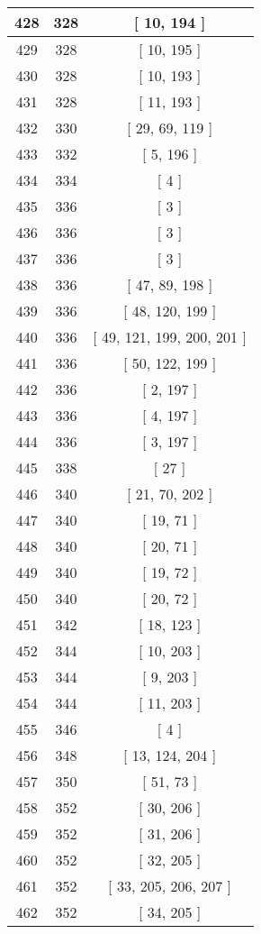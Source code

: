\begin{center}
\begin{longtable}[H]{|| c c c ||}
\hline
428 & 328 & [ 10, 194 ] \\ 
\hline
429 & 328 & [ 10, 195 ] \\ 
\hline
430 & 328 & [ 10, 193 ] \\ 
\hline
431 & 328 & [ 11, 193 ] \\ 
\hline
432 & 330 & [ 29, 69, 119 ] \\ 
\hline
433 & 332 & [ 5, 196 ] \\ 
\hline
434 & 334 & [ 4 ] \\ 
\hline
435 & 336 & [ 3 ] \\ 
\hline
436 & 336 & [ 3 ] \\ 
\hline
437 & 336 & [ 3 ] \\ 
\hline
438 & 336 & [ 47, 89, 198 ] \\ 
\hline
439 & 336 & [ 48, 120, 199 ] \\ 
\hline
440 & 336 & [ 49, 121, 199, 200, 201 ] \\ 
\hline
441 & 336 & [ 50, 122, 199 ] \\ 
\hline
442 & 336 & [ 2, 197 ] \\ 
\hline
443 & 336 & [ 4, 197 ] \\ 
\hline
444 & 336 & [ 3, 197 ] \\ 
\hline
445 & 338 & [ 27 ] \\ 
\hline
446 & 340 & [ 21, 70, 202 ] \\ 
\hline
447 & 340 & [ 19, 71 ] \\ 
\hline
448 & 340 & [ 20, 71 ] \\ 
\hline
449 & 340 & [ 19, 72 ] \\ 
\hline
450 & 340 & [ 20, 72 ] \\ 
\hline
451 & 342 & [ 18, 123 ] \\ 
\hline
452 & 344 & [ 10, 203 ] \\ 
\hline
453 & 344 & [ 9, 203 ] \\ 
\hline
454 & 344 & [ 11, 203 ] \\ 
\hline
455 & 346 & [ 4 ] \\ 
\hline
456 & 348 & [ 13, 124, 204 ] \\ 
\hline
457 & 350 & [ 51, 73 ] \\ 
\hline
458 & 352 & [ 30, 206 ] \\ 
\hline
459 & 352 & [ 31, 206 ] \\ 
\hline
460 & 352 & [ 32, 205 ] \\ 
\hline
461 & 352 & [ 33, 205, 206, 207 ] \\ 
\hline
462 & 352 & [ 34, 205 ] \\ 

\end{longtable}
\end{center}
